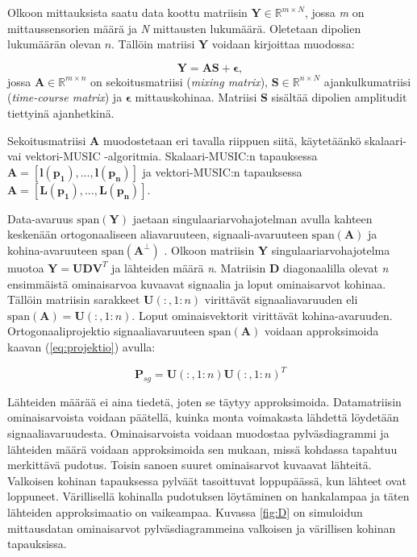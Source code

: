 Olkoon mittauksista saatu data koottu matriisin $\mathbf{Y}\in \mathbb{R}^{m\times N}$, jossa \textit{m} on mittaussensorien määrä ja \textit{N} mittausten lukumäärä. Oletetaan dipolien lukumäärän olevan $n$. Tällöin matriisi $\mathbf{Y}$ voidaan kirjoittaa muodossa:

\begin{equation}
    \mathbf{Y=AS+\epsilon},
\end{equation}
jossa $\mathbf{A}\in \mathbb{R}^{m\times n}$ on sekoitusmatriisi (\textit{mixing matrix}), $\mathbf{S}\in \mathbb{R}^{n\times N}$ ajankulkumatriisi (\textit{time-course matrix}) ja $\mathbf{\epsilon}$ mittauskohinaa. Matriisi \textbf{S} sisältää dipolien amplitudit tiettyinä ajanhetkinä.

Sekoitusmatriisi \textbf{A} muodostetaan eri tavalla riippuen siitä, käytetäänkö skalaari- vai vektori-MUSIC -algoritmia. Skalaari-MUSIC:n tapauksessa $\mathbf{A = [l(p_1),...,l(p_n)]}$ ja vektori-MUSIC:n tapauksessa $\mathbf{A = [L(p_1),...,L(p_n)]}$.

Data-avaruus $\text{span}(\mathbf{Y})$ jaetaan singulaariarvohajotelman avulla kahteen keskenään ortogonaaliseen aliavaruuteen, signaali-avaruuteen $\text{span}(\mathbf{A})$  ja kohina-avaruuteen $\text{span}(\mathbf{A^\bot})$ \citep{Mosher1999SourceMUSIC}. Olkoon matriisin \textbf{Y} singulaariarvohajotelma muotoa $\mathbf{Y = UDV}^T$ ja lähteiden määrä \textit{n}. Matriisin \textbf{D} diagonaalilla olevat \textit{n} ensimmäistä ominaisarvoa kuvaavat signaalia ja loput ominaisarvot kohinaa. Tällöin matriisin sarakkeet $\mathbf{U}(:,1:n)$ virittävät signaaliavaruuden eli $\text{span}(\mathbf{A}) = \mathbf{U}(:,1:n)$. Loput ominaisvektorit virittävät kohina-avaruuden. \citep{Mosher1999SourceMUSIC, Makela2018TruncatedLocalization} Ortogonaaliprojektio signaaliavaruuteen $\text{span}(\mathbf{A})$ voidaan approksimoida kaavan (\ref{eq:projektio}) avulla:

\begin{equation}
    \mathbf{P}_{sg}=\mathbf{U}(:,1:n)\mathbf{U}(:,1:n)^T
\end{equation} \citep{Makela2018TruncatedLocalization}

Lähteiden määrää ei aina tiedetä, joten se täytyy approksimoida. Datamatriisin ominaisarvoista voidaan päätellä, kuinka monta voimakasta lähdettä löydetään signaaliavaruudesta. Ominaisarvoista voidaan muodostaa pylväsdiagrammi ja lähteiden määrä voidaan approksimoida sen mukaan, missä kohdassa tapahtuu merkittävä pudotus. Toisin sanoen suuret ominaisarvot kuvaavat lähteitä. Valkoisen kohinan tapauksessa pylväät tasoittuvat loppupäässä, kun lähteet ovat loppuneet. Värillisellä kohinalla pudotuksen löytäminen on hankalampaa ja täten lähteiden approksimaatio on vaikeampaa. Kuvassa \ref{fig:D} on simuloidun mittausdatan ominaisarvot pylväsdiagrammeina valkoisen ja värillisen kohinan tapauksissa.

